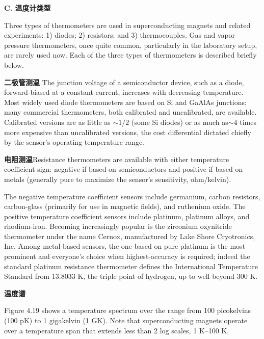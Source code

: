 \textbf{C. 温度计类型}

Three types of thermometers are used in superconducting magnets and related
experiments: 1) diodes; 2) resistors; and 3) thermocouples. Gas and vapor pressure
thermometers, once quite common, particularly in the laboratory setup, are rarely
used now. Each of the three types of thermometers is described briefly below.

\textbf{二极管测温} The junction voltage of a semiconductor device, such as
a diode, forward-biased at a constant current, increases with decreasing temperature. Most widely used diode thermometers are based on Si and GaAlAs junctions;
many commercial thermometers, both calibrated and uncalibrated, are available.
Calibrated versions are as little as $\sim 1/2$ (some Si diodes) or as much as$\sim 4$ times
more expensive than uncalibrated versions, the cost differential dictated chiefly by
the sensor’s operating temperature range.

\textbf{电阻测温}Resistance thermometers are available with either
temperature coefficient sign: negative if based on semiconductors and positive if
based on metals (generally pure to maximize the sensor’s sensitivity, ohm/kelvin).

The negative temperature coefficient sensors include germanium, carbon resistors,
carbon-glass (primarily for use in magnetic fields), and ruthenium oxide. The
positive temperature coefficient sensors include platinum, platinum alloys, and
rhodium-iron. Becoming increasingly popular is the zirconium oxynitride thermometer under the name Cernox, manufactured by Lake Shore Cryotronics, Inc.
Among metal-based sensors, the one based on pure platinum is the most prominent and everyone’s choice when highest-accuracy is required; indeed the standard
platinum resistance thermometer defines the International Temperature Standard
from 13.8033 K, the triple point of hydrogen, up to well beyond 300 K.

\textbf{温度谱}

Figure 4.19 shows a temperature spectrum over the range from 100 picokelvins
(100 pK) to 1 gigakelvin (1 GK). Note that superconducting magnets operate over
a temperature span that extends less than 2 log scales, 1 K–100 K.

